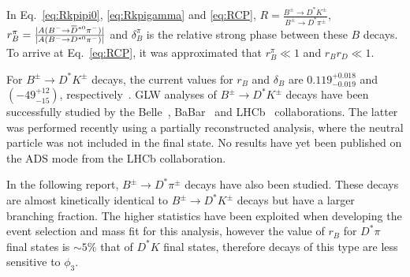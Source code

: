 \documentclass[oneside,12pt]{article}
\newcommand{\overbar}[1]{\mkern 1.5mu\overline{\mkern-1.5mu#1\mkern-1.5mu}\mkern
1.5mu}
\begin{document}
\noindent In Eq.~\eqref{eq:Rkpipi0}, \eqref{eq:Rkpigamma} and \eqref{eq:RCP},
$R=\frac{B^{\pm}\rightarrow D^* K^{\pm}}{B^{\pm}\rightarrow D^* \pi^{\pm}}$,
$r_B^{\pi}=\frac{|A(B^{-}\rightarrow
\overbar{D}^{*0}\pi^-)|}{|A(B^{-}\rightarrow {D}^{*0}\pi^-)|}$ and
$\delta_{B}^{\pi}$ is the relative strong phase between these $B$ decays. To
arrive at Eq.~\eqref{eq:RCP}, it was approximated that $r_B^{\pi}\ll 1$ and
$r_Br_D \ll 1$.

For $B^{\pm}\rightarrow D^{*}K^{\pm}$ decays, the
current values for $r_B$ and $\delta_B$ are $0.119^{+0.018}_{-0.019}$ and
$(-49^{+12}_{-15})$\degree, respectively~\cite{website:CKMFitter}. GLW analyses
of $B^{\pm}\rightarrow D^{*}K^{\pm}$ decays have been successfully studied by
the Belle~\cite{BelleGLW}, BaBar~\cite{BaBarGLW} and LHCb~\cite{PartReco}
collaborations. The latter was performed recently using a partially
reconstructed analysis, where the neutral particle was not included in the final
state. No results have yet been published on the ADS mode from the LHCb
collaboration.   

In the following report, $B^{\pm}\rightarrow D^{*}\pi^{\pm}$ decays have also
been studied. These decays are almost kinetically identical to
$B^{\pm}\rightarrow D^{*}K^{\pm}$ decays but have a larger branching fraction.
The higher statistics have been exploited when developing the event selection
and mass fit for this analysis, however the value of $r_B$ for $D^*\pi$ final
states is $\sim 5\%$ that of $D^*K$ final states, therefore decays of this
type are less sensitive to $\phi_3$.

\vspace{-3mm}
\end{document}
